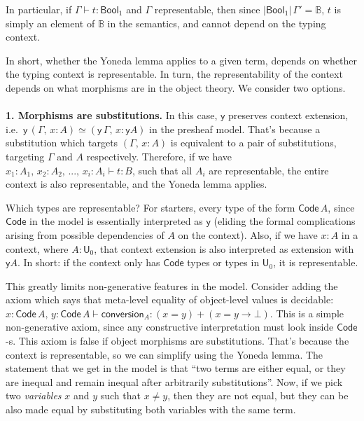 \documentclass[11pt,a4paper,twoside]{article}
\newcommand{\msf}[1]{\mathsf{#1}}
\newcommand{\U}{\mathsf{U}}
\newcommand{\Code}{\mathsf{Code}}
\newcommand{\Bool}{\msf{Bool}}
\begin{document}
In particular, if $\Gamma \vdash t : \Bool_1$ and $\Gamma$ representable, then
since $|\Bool_1|\,\Gamma' = \mathbb{B}$, $t$ is simply an element of
$\mathbb{B}$ in the semantics, and cannot depend on the typing context.

In short, whether the Yoneda lemma applies to a given term, depends on whether
the typing context is representable. In turn, the representability of the context
depends on what morphisms are in the object theory. We consider two options.
\\\\
\textbf{1. Morphisms are substitutions.} In this case, $\msf{y}$ preserves
context extension, i.e.\ $\msf{y}\,(\Gamma,\,x : A) \simeq (\msf{y}\,\Gamma,\,x
: \msf{y}A)$ in the presheaf model. That's because a substitution which targets
$(\Gamma,\,x : A)$ is equivalent to a pair of substitutions, targeting $\Gamma$
and $A$ respectively. Therefore, if we have $x_1 : A_1,\,x_2 : A_2,\,...,\, x_i :
A_i \vdash t : B$, such that all $A_i$ are representable, the entire context is
also representable, and the Yoneda lemma applies.

Which types are representable? For starters, every type of the form $\Code\,A$,
since $\Code$ in the model is essentially interpreted as $\msf{y}$ (eliding the
formal complications arising from possible dependencies of $A$ on the context).
Also, if we have $x : A$ in a context, where $A : \U_0$, that context extension
is also interpreted as extension with $\msf{y}A$. In short: if the context
only has $\Code$ types or types in $\U_0$, it is representable.

This greatly limits non-generative features in the model. Consider adding the
axiom which says that meta-level equality of object-level values is decidable:
$x : \Code\,A,\,y : \Code\,A \vdash \msf{conversion}_A : (x = y) + (x = y \to
\bot)$.  This is a simple non-generative axiom, since any constructive
interpretation must look inside $\Code$-s. This axiom is false if object
morphisms are substitutions. That's because the context is representable, so we
can simplify using the Yoneda lemma. The statement that we get in the model is
that ``two terms are either equal, or they are inequal and remain inequal after
arbitrarily substitutions''. Now, if we pick two \emph{variables} $x$ and $y$
such that $x \neq y$, then they are not equal, but they can be also made
equal by substituting both variables with the same term.
\end{document}
